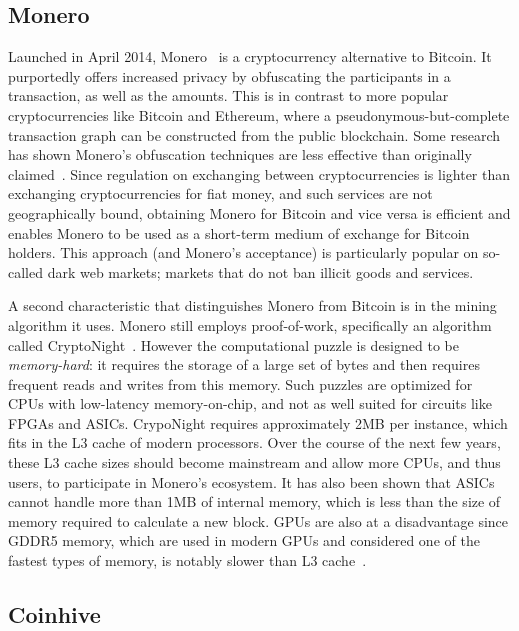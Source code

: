 \subsection{Monero}

Launched in April 2014, Monero~\cite{monero} is a cryptocurrency alternative to Bitcoin. It purportedly offers increased privacy by obfuscating the participants in a transaction, as well as the amounts. This is in contrast to more popular cryptocurrencies like Bitcoin and Ethereum, where a pseudonymous-but-complete transaction graph can be constructed from the public blockchain. Some research has shown Monero's obfuscation techniques are less effective than originally claimed~\cite{MMLN17,kumar2017traceability}. Since regulation on exchanging between cryptocurrencies is lighter than exchanging cryptocurrencies for fiat money, and such services are not geographically bound, obtaining Monero for Bitcoin and vice versa is efficient and enables Monero to be used as a short-term medium of exchange for Bitcoin holders. This approach (and Monero's acceptance) is particularly popular on so-called dark web markets; markets that do not ban illicit goods and services.

A second characteristic that distinguishes Monero from Bitcoin is in the mining algorithm it uses. Monero still employs proof-of-work, specifically an algorithm called CryptoNight~\cite{cryptoknight}. However the computational puzzle is designed to be \textit{memory-hard}: it requires the storage of a large set of bytes and then requires frequent reads and writes from this memory. Such puzzles are optimized for CPUs with low-latency memory-on-chip, and not as well suited for circuits like FPGAs and ASICs. CrypoNight requires approximately 2MB per instance, which fits in the L3 cache of modern processors. Over the course of the next few years, these L3 cache sizes should become mainstream and allow more CPUs, and thus users, to participate in Monero's ecosystem. It has also been shown that ASICs cannot handle more than 1MB of internal memory, which is less than the size of memory required to calculate a new block. GPUs are also at a disadvantage since GDDR5 memory, which are used in modern GPUs and considered one of the fastest types of memory, is notably slower than L3 cache~\cite{van2013cryptonote}.  


\subsection{Coinhive}

